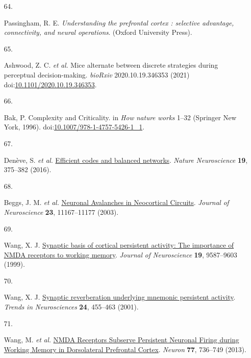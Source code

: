 \documentclass[
]{article}
\newlength{\cslhangindent}
\newlength{\csllabelwidth}
\newlength{\cslentryspacingunit} %
\newenvironment{CSLReferences}[2] %
 {%
  \setlength{\parindent}{0pt}
  \ifodd #1
  \let\oldpar\par
  \def\par{\hangindent=\cslhangindent\oldpar}
  \fi
  \setlength{\parskip}{#2\cslentryspacingunit}
 }%
 {}
\newcommand{\CSLLeftMargin}[1]{\parbox[t]{\csllabelwidth}{#1}}
\newcommand{\CSLRightInline}[1]{\parbox[t]{\linewidth - \csllabelwidth}{#1}\break}
\begin{document}
\begin{CSLReferences}{0}{0}
\leavevmode{}%
\CSLLeftMargin{64. }%
\CSLRightInline{Passingham, R. E. \emph{{Understanding the prefrontal
cortex : selective advantage, connectivity, and neural operations}}.
(Oxford University Press).}

\leavevmode{}%
\CSLLeftMargin{65. }%
\CSLRightInline{Ashwood, Z. C. \emph{et al.} {Mice alternate between
discrete strategies during perceptual decision-making}. \emph{bioRxiv}
2020.10.19.346353 (2021)
doi:\href{https://doi.org/10.1101/2020.10.19.346353}{10.1101/2020.10.19.346353}.}

\leavevmode{}%
\CSLLeftMargin{66. }%
\CSLRightInline{Bak, P. {Complexity and Criticality}. in \emph{How
nature works} 1--32 (Springer New York, 1996).
doi:\href{https://doi.org/10.1007/978-1-4757-5426-1_1}{10.1007/978-1-4757-5426-1\_1}.}

\leavevmode{}%
\CSLLeftMargin{67. }%
\CSLRightInline{Denève, S. \emph{et al.}
\href{https://doi.org/10.1038/nn.4243}{{Efficient codes and balanced
networks}}. \emph{Nature Neuroscience} \textbf{19}, 375--382 (2016).}

\leavevmode{}%
\CSLLeftMargin{68. }%
\CSLRightInline{Beggs, J. M. \emph{et al.}
\href{https://doi.org/10.1523/jneurosci.23-35-11167.2003}{{Neuronal
Avalanches in Neocortical Circuits}}. \emph{Journal of Neuroscience}
\textbf{23}, 11167--11177 (2003).}

\leavevmode{}%
\CSLLeftMargin{69. }%
\CSLRightInline{Wang, X. J.
\href{https://doi.org/10.1523/jneurosci.19-21-09587.1999}{{Synaptic
basis of cortical persistent activity: The importance of NMDA receptors
to working memory}}. \emph{Journal of Neuroscience} \textbf{19},
9587--9603 (1999).}

\leavevmode{}%
\CSLLeftMargin{70. }%
\CSLRightInline{Wang, X. J.
\href{https://doi.org/10.1016/S0166-2236(00)01868-3}{{Synaptic
reverberation underlying mnemonic persistent activity}}. \emph{Trends in
Neurosciences} \textbf{24}, 455--463 (2001).}

\leavevmode{}%
\CSLLeftMargin{71. }%
\CSLRightInline{Wang, M. \emph{et al.}
\href{https://doi.org/10.1016/j.neuron.2012.12.032}{{NMDA Receptors
Subserve Persistent Neuronal Firing during Working Memory in
Dorsolateral Prefrontal Cortex}}. \emph{Neuron} \textbf{77}, 736--749
(2013).}


\end{CSLReferences}
\end{document}
